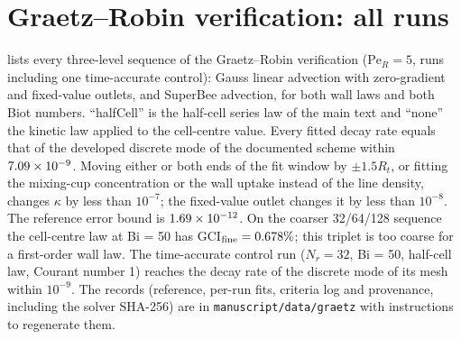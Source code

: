 \documentclass{article}
\begin{document}
\section{Graetz--Robin verification: all runs}
\label{sec:s-graetz}
 lists every three-level sequence of the
Graetz--Robin verification ($\mathrm{Pe}_R=5$, \GraetzRuns{} runs including one
time-accurate control): Gauss linear advection with zero-gradient and
fixed-value outlets, and SuperBee advection, for both wall laws and
both Biot numbers. ``halfCell'' is the half-cell series law of the main
text and ``none'' the kinetic law applied to the cell-centre value. Every fitted decay rate equals that of the developed discrete mode of
the documented scheme within $7.09\times10^{-9}$. Moving either or both ends
of the fit window by $\pm1.5R_t$, or fitting the mixing-cup concentration
or the wall uptake instead of the line density, changes $\kappa$ by less
than $10^{-7}$; the fixed-value outlet changes it by less than
$10^{-8}$. The reference error bound is $1.69\times10^{-12}$. On the
coarser 32/64/128 sequence the cell-centre law at Bi = 50 has
GCI$_{\rm fine}=0.678\%$; this triplet is too coarse for a first-order
wall law. The time-accurate control run ($N_r=32$, Bi = 50, half-cell
law, Courant number 1) reaches the decay rate of the discrete mode of
its mesh within $10^{-9}$. The records (reference, per-run fits,
criteria log and provenance, including the solver SHA-256) are in
\texttt{manuscript/data/graetz} with instructions to regenerate them.
\begin{table}[htbp]
\centering
\caption{Observed order $p$, relative error of the Richardson-extrapolated
decay rate and GCI$_{\rm fine}$ \cite{Celik2008procedure} (refinement
ratio 2, safety factor 1.25) for every three-level sequence of the
Graetz--Robin verification.}
\label{tab:graetz-full}
\small
\end{table}


\begingroup
\small

\endgroup
\end{document}
